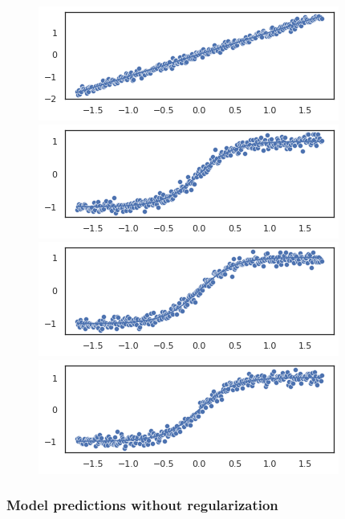 \begin{figure}[H]
\centering
\includegraphics[width=0.15\paperwidth]{fig/normality_and_linearity_violation_files/normality_and_linearity_violation_3_0.png}
\includegraphics[width=0.15\paperwidth]{fig/normality_and_linearity_violation_files/normality_and_linearity_violation_3_1.png}
\includegraphics[width=0.15\paperwidth]{fig/normality_and_linearity_violation_files/normality_and_linearity_violation_3_2.png}
\includegraphics[width=0.15\paperwidth]{fig/normality_and_linearity_violation_files/normality_and_linearity_violation_3_3.png}
\end{figure}

\hypertarget{model-predictions-without-regularization}{%
\subsubsection{\texorpdfstring{Model predictions \textbf{without}
regularization}{Model predictions without regularization}}\label{model-predictions-without-regularization}}

